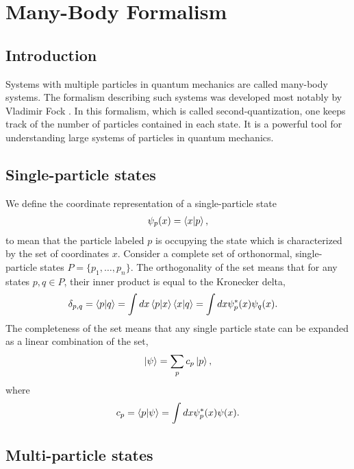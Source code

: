 \documentclass[Dual]{msu-thesis}
\begin{document}
\section{Many-Body Formalism}

\subsection{Introduction}

Systems with multiple particles in quantum mechanics are called many-body systems. The formalism describing such systems was developed most notably by Vladimir Fock \cite{fock}. In this formalism, which is called second-quantization, one keeps track of the number of particles contained in each state. It is a powerful tool for understanding large systems of particles in quantum mechanics.

\subsection{Single-particle states}

We define the coordinate representation of a single-particle state
\begin{align}
\psi_p(x) = \bra{x}\ket{p},
\end{align}
to mean that the particle labeled $p$ is occupying the state which is characterized by the set of coordinates $x$. Consider a complete set of orthonormal, single-particle states $P = \{p_1,\ldots ,p_n\}$. The orthogonality of the set means that for any states $p,q \in P$, their inner product is equal to the Kronecker delta,
\begin{align}
\delta_{p,q}
&= \bra{p}\ket{q}
=\int dx\bra{p}\ket{x}\bra{x}\ket{q}
=\int dx\psi^*_p(x)\psi_q(x).
\end{align}
The completeness of the set means that any single particle state can be expanded as a linear combination of the set,
\begin{align}
\ket{\psi}=\sum_pc_p\ket{p},
\end{align}
where
\begin{align}
c_p=\bra{p}\ket{\psi} = \int dx\psi^*_p(x)\psi(x).
\end{align}

\subsection{Multi-particle states}
\end{document}
